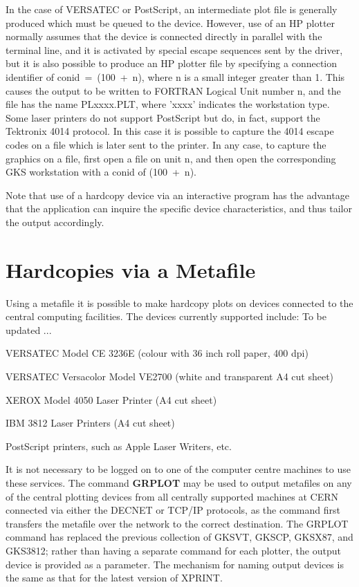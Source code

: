 In the case of VERSATEC or PostScript,
an intermediate plot file is generally produced
which must be queued to the device.
However, use of an HP plotter normally assumes that the device is connected
directly in parallel with the terminal line, and it is activated by special
escape sequences sent by the driver, but it is also possible to produce
an HP plotter file by specifying a connection identifier of
conid~=~(100~+~n), where n is a small integer greater
than 1. This causes the output to be written to FORTRAN Logical Unit number n,
and the file has the name PLxxxx.PLT, where 'xxxx' indicates the
workstation type. Some laser printers do not support
PostScript but do, in fact, support the Tektronix 4014 protocol.
In this case it is possible to capture the 4014 escape codes
on a file which is later sent to the printer. In any case,
to capture the graphics on a file, first open a file on unit n,
and then open the corresponding GKS
workstation with a conid of (100~+~n).
 
Note that use of a hardcopy device via an interactive program has the
advantage that the application can inquire the specific device
characteristics, and thus tailor the output accordingly.
\section{\protect\label{sec:mhcpref}Hardcopies via a Metafile}
 
Using a metafile it is possible to make hardcopy plots on devices connected
to the central computing facilities. The devices currently supported
include:
\Lit{$==>$} To be updated ...
\begin{UL}
\item VERSATEC Model CE 3236E (colour with 36 inch roll paper, 400 dpi)
\item VERSATEC Versacolor Model VE2700 (white and transparent A4 cut sheet)
\item XEROX Model 4050 Laser Printer (A4 cut sheet)
\item IBM 3812 Laser Printers  (A4 cut sheet)
\item PostScript printers, such as Apple Laser Writers, etc.
\end{UL}
 
It is not necessary to be logged on to one of the computer centre machines
to use these services. The command {\bf GRPLOT} may be used to output
metafiles on any of the central plotting devices from all centrally supported
machines at CERN connected via either the DECNET or TCP/IP protocols,
as the command first transfers the metafile over the network
to the correct destination.
The GRPLOT command has replaced the previous
collection of GKSVT, GKSCP, GKSX87, and GKS3812;
rather than having a separate command for each plotter, the output device is
provided as a parameter. The mechanism for naming output devices is the
same as that for the latest version of XPRINT.
 
